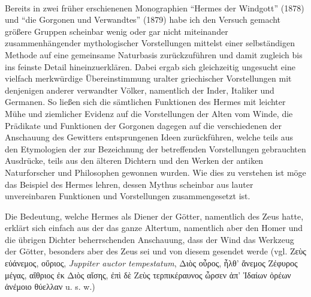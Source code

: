 \documentclass[a4paper, 11pt, oneside]{article}
\begin{document}
\paragraph{}
Bereits in zwei früher erschienenen Monographien "`Hermes der Windgott"' (1878) und "`die Gorgonen und Verwandtes"' (1879) habe ich den Versuch gemacht größere Gruppen scheinbar wenig oder gar nicht miteinander zusammenhängender mythologischer Vorstellungen mittelst einer selbständigen Methode auf eine gemeinsame Naturbasis zurückzuführen und damit zugleich bis ins feinste Detail hineinzuerklären. Dabei ergab sich gleichzeitig ungesucht eine vielfach merkwürdige Übereinstimmung uralter griechischer Vorstellungen mit denjenigen anderer verwandter Völker, namentlich der Inder, Italiker und Germanen. So ließen sich die sämtlichen Funktionen des Hermes mit leichter Mühe und ziemlicher Evidenz auf die Vorstellungen der Alten vom Winde, die Prädikate und Funktionen der Gorgonen dagegen auf die verschiedenen der Anschauung des Gewitters entsprungenen Ideen zurückführen, welche teils aus den Etymologien der zur Bezeichnung der betreffenden Vorstellungen gebrauchten Ausdrücke, teils aus den älteren Dichtern und den Werken der antiken Naturforscher und Philosophen gewonnen wurden. Wie dies zu verstehen ist möge das Beispiel des Hermes lehren, dessen Mythus scheinbar aus lauter unvereinbaren Funktionen und Vorstellungen zusammengesetzt ist.

Die Bedeutung, welche Hermes als Diener der Götter, namentlich des Zeus hatte, erklärt sich einfach aus der das ganze Altertum, namentlich aber den Homer und die übrigen Dichter beherrschenden Anschauung, dass der Wind das Werkzeug der Götter, besonders aber des Zeus sei und von diesem gesendet werde (vgl. Ζεὺς εὐάνεμος, οὔριος, \emph{Juppiter auctor tempestatum}, Διὸς οὖρος, ἦλθ' ἄνεμος Ζέφυρος μέγας, αἴθριος ἐκ Διὸς αἴσης, ἐπὶ δὲ Ζεὺς τερπικέραυνος ὦρσεν ἀπ' Ἰδαίων ὀρέων ἀνέμοιο θύελλαν u. s. w.)
\end{document}
